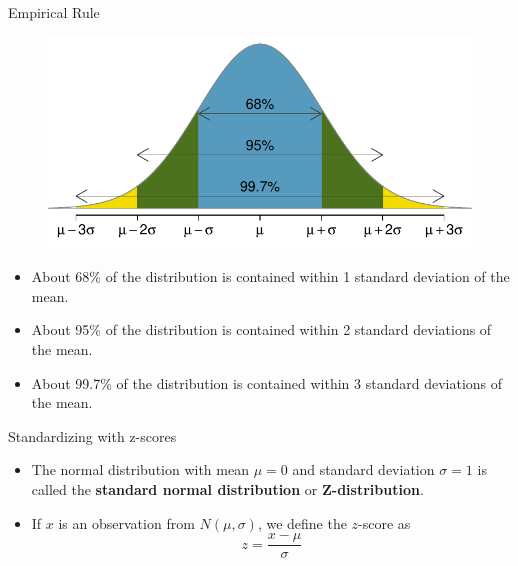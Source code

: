 \documentclass{beamer}
\begin{document}
\begin{frame}{Empirical Rule}
\begin{figure}
\includegraphics[scale=0.55]{figure/empirical.pdf}
\end{figure}
\small
\begin{itemize}
\item About 68\% of the distribution is contained within 1 standard deviation of the mean.
\item About 95\% of the distribution is contained within 2 standard deviations of the mean.
\item About 99.7\% of the distribution is contained within 3 standard deviations of the mean.
\end{itemize}
\end{frame}

\begin{frame}{Standardizing with z-scores}
\begin{itemize}
\item The normal distribution with mean $\mu = 0$ and standard deviation $\sigma = 1$ is called the \textbf{standard normal distribution} or \textbf{Z-distribution}.
\vspace{5pt}
\item If $x$ is an observation from $N(\mu, \sigma)$, we define the $z$-score as
$$z = \frac{x - \mu}{\sigma}$$
\end{itemize}
\end{frame}
\end{document}
